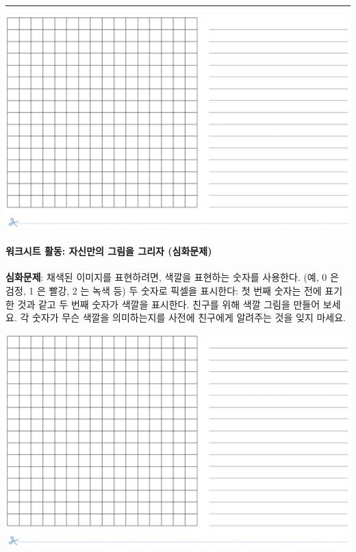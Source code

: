 \documentclass[]{article}
\begin{document}
\begin{center}\rule{0.5\linewidth}{\linethickness}\end{center}

\includegraphics{csunplugged/01-part/img/ch02-img/02-image-04-worksheet-01.png}

\mbox{}\paragraph{워크시트 활동: 자신만의 그림을 그리자
(심화문제)}\label{section-37}

\textbf{심화문제}: 채색된 이미지를 표현하려면, 색깔을 표현하는 숫자를
사용한다. (예, 0 은 검정, 1 은 빨강, 2 는 녹색 등) 두 숫자로 픽셀을
표시한다: 첫 번째 숫자는 전에 표기한 것과 같고 두 번째 숫자가 색깔을
표시한다. 친구를 위해 색깔 그림을 만들어 보세요. 각 숫자가 무슨 색깔을
의미하는지를 사전에 친구에게 알려주는 것을 잊지 마세요.

\includegraphics{csunplugged/01-part/img/ch02-img/02-image-04-worksheet-01.png}
\end{document}
